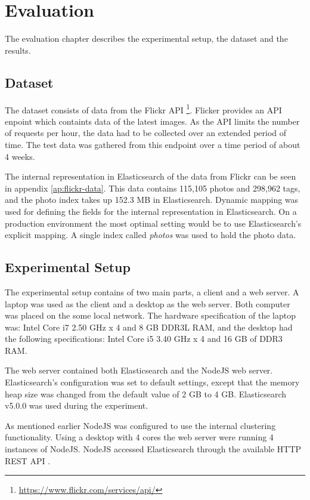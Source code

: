 \chapter{Evaluation}
\label{ch:evaluation}
The evaluation chapter describes the experimental setup, the dataset and the results.

\section{Dataset}
\label{sec:dataset}
The dataset consists of data from the Flickr API \footnote{\url{https://www.flickr.com/services/api/}}.
Flicker provides an API enpoint which containts data of the latest images.
As the API limits the number of requests per hour, the data had to be collected over an extended period of time.
The test data was gathered from this endpoint over a time period of about 4 weeks.

The internal representation in Elasticsearch of the data from Flickr can be seen in appendix \ref{ap:flickr-data}.
This data contains 115,105 photos and 298,962 tags, and the photo index takes up 152.3 MB in Elasticsearch.
Dynamic mapping was used for defining the fields for the internal representation in Elasticsearch.
On a production environment the most optimal setting would be to use Elasticsearch's explicit mapping.
A single index called \textit{photos} was used to hold the photo data.

\section{Experimental Setup}
The experimental setup contains of two main parts, a client and a web server.
A laptop was used as the client and a desktop as the web server.
Both computer was placed on the some local network.
The hardware specification of the laptop was: Intel Core i7 2.50 GHz x 4 and 8 GB DDR3L RAM,
and the desktop had the following specifications: Intel Core i5 3.40 GHz x 4 and 16 GB of DDR3 RAM.

The web server contained both Elasticsearch and the NodeJS web server.
Elasticsearch's configuration was set to default settings,
except that the memory heap size was changed from the default value of 2 GB to 4 GB.
Elasticsearch v5.0.0 was used during the experiment.

As mentioned earlier NodeJS was configured to use the internal clustering functionality.
Using a desktop with 4 cores the web server were running 4 instances of NodeJS.
NodeJS accessed Elasticsearch through the available HTTP REST API \cite{elasticsearch-rest-api}.

